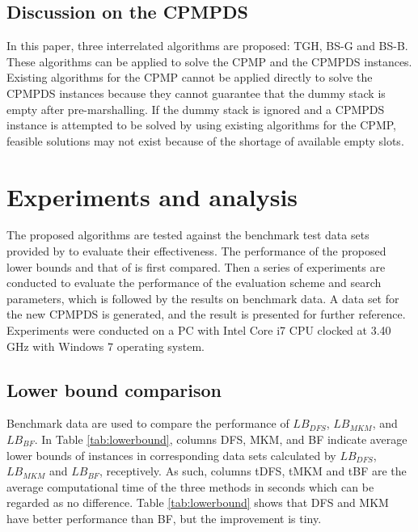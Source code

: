\documentclass[review,3p,times,authoryear,12pt]{elsarticle}
\begin{document}
\subsection{Discussion on the CPMPDS}

In this paper, three interrelated algorithms are proposed: TGH, BS-G and BS-B.
These algorithms can be applied to solve the CPMP and the CPMPDS instances. Existing algorithms for the CPMP cannot be applied directly to solve the CPMPDS instances because they cannot guarantee that the dummy stack is empty after pre-marshalling.
If the dummy stack is ignored and a CPMPDS instance is attempted to be solved by using existing algorithms for the CPMP, feasible solutions may not exist because of the shortage of available empty slots.

\section{Experiments and analysis}
\label{sec:ce}

The proposed algorithms are tested against the benchmark test data sets provided by \cite{BF2012} to evaluate their effectiveness.
The performance of the proposed lower bounds and that of \cite{BF2012} is first compared. Then a series of experiments are conducted to evaluate the performance of the evaluation scheme and search parameters, which is followed by the results on benchmark data.
A data set for the new CPMPDS is generated, and the result is presented for further reference.
Experiments were conducted on a PC with Intel Core i7 CPU clocked at 3.40 GHz with Windows 7 operating system.

\subsection {Lower bound comparison}

Benchmark data are used to compare the performance of $\mathit{LB}_\mathit{DFS}$, $\mathit{LB}_\mathit{MKM}$, and $\mathit{LB}_\mathit{BF}$.
In Table \ref{tab:lowerbound}, columns DFS, MKM, and BF indicate average lower bounds of instances in corresponding data sets calculated by $\mathit{LB}_\mathit{DFS}$, $\mathit{LB}_\mathit{MKM}$ and $\mathit{LB}_\mathit{BF}$, receptively.
As such, columns tDFS, tMKM and tBF are the average computational time of the three methods in seconds which can be regarded as no difference.
Table \ref{tab:lowerbound} shows that DFS and MKM have better performance than BF, but the improvement is tiny.
\end{document}
